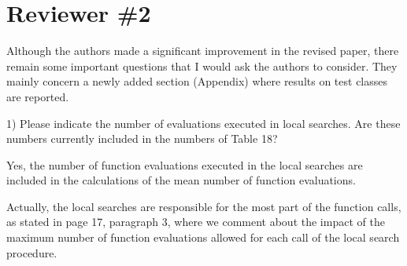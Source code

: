 
\section*{Reviewer \#2}

\begin{revAns}{Although the authors made a significant improvement in the revised paper, there remain some important questions that I would ask the authors to consider. They mainly concern a newly added section (Appendix) where results on test classes are reported.

1) Please indicate the number of evaluations executed in local searches. Are these numbers currently included in the numbers of Table 18?}

Yes, the number of function evaluations executed in the local searches are included in the calculations of the mean number of function evaluations. 

Actually, the local searches are responsible for the most part of the function calls, as stated in page 17, paragraph 3, where we comment about the impact of the maximum number of function evaluations allowed for each call of the local search procedure.

\end{revAns}



